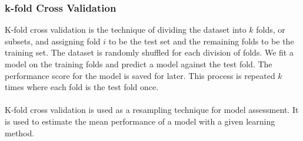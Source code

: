 \documentclass[a4paper,twocolumn]{article}
\begin{document}
\subsubsection{k-fold Cross Validation}
K-fold cross validation is the technique of dividing the dataset into $k$ folds, or subsets, and assigning fold $i$ to be the test set and the remaining folds to be the training set. The dataset is randomly shuffled for each division of folds. We fit a model on the training folds and predict a model against the test fold. The performance score for the model is saved for later. This process is repeated $k$ times where each fold is the test fold once.\\
\\
K-fold cross validation is used as a resampling technique for model assessment. It is used to estimate the mean performance of a model with a given learning method.
\end{document}
